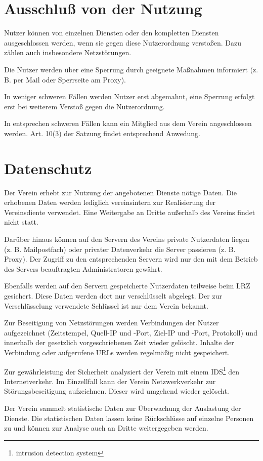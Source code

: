 \documentclass[a4paper,10pt]{scrartcl}
\begin{document}
\section{Ausschluß von der Nutzung}
Nutzer können von einzelnen Diensten oder den kompletten Diensten ausgeschlossen werden, wenn sie gegen diese Nutzerordnung verstoßen. Dazu zählen auch insbesondere Netzstörungen.

Die Nutzer werden über eine Sperrung durch geeignete Maßnahmen informiert (z. B. per Mail oder Sperrseite am Proxy).

In weniger schweren Fällen werden Nutzer erst abgemahnt, eine Sperrung erfolgt erst bei weiterem Verstoß gegen die Nutzerordnung.

In entsprechen schweren Fällen kann ein Mitglied aus dem Verein angeschlossen werden. Art. 10(3) der Satzung findet entsprechend Anwedung. 

\section{Datenschutz}
Der Verein erhebt zur Nutzung der angebotenen Dienste nötige Daten. Die erhobenen Daten werden lediglich vereinsintern zur Realisierung der Vereinsdiente verwendet. Eine Weitergabe an Dritte außerhalb des Vereins findet nicht statt.

Darüber hinaus können auf den Servern des Vereins private Nutzerdaten liegen (z. B. Mailpostfach) oder privater Datenverkehr die Server passieren (z. B. Proxy). Der Zugriff zu den entsprechenden Servern wird nur den mit dem Betrieb des Servers beauftragten Administratoren gewährt.

Ebenfalls werden auf den Servern gespeicherte Nutzerdaten teilweise beim LRZ gesichert. Diese Daten werden dort nur verschlüsselt abgelegt. Der zur Verschlüsselung verwendete Schlüssel ist nur dem Verein bekannt.

Zur Beseitigung von Netzstörungen werden Verbindungen der Nutzer aufgezeichnet (Zeitstempel, Quell-IP und -Port, Ziel-IP und -Port, Protokoll) und innerhalb der gesetzlich vorgeschriebenen Zeit wieder gelöscht. Inhalte der Verbindung oder aufgerufene URLs werden regelmäßig nicht gespeichert.

Zur gewährleistung der Sicherheit analysiert der Verein mit einem IDS\footnote{intrusion detection system} den Internetverkehr. Im Einzellfall kann der Verein Netzwerkverkehr zur Störungsbeseitigung aufzeichnen. Dieser wird umgehend wieder gelöscht.

Der Verein sammelt statistische Daten zur Überwachung der Auslastung der Dienste. Die statistischen Daten lassen keine Rückschlüsse auf einzelne Personen zu und können zur Analyse auch an Dritte weitergegeben werden.
\end{document}
